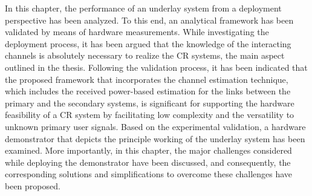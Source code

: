 In this chapter, the performance of an underlay system from a deployment perspective has been analyzed. To this end, an analytical framework has been validated by means of hardware measurements. 
While investigating the deployment process, it has been argued that the knowledge of the interacting channels is absolutely necessary to realize the CR systems, the main aspect outlined in the thesis. 
Following the validation process, it has been indicated that the proposed framework that incorporates the channel estimation technique, which includes the received power-based estimation for the links between the primary and the secondary systems, is significant for supporting the hardware feasibility of a CR system by facilitating low complexity and the versatility to unknown primary user signals. Based on the experimental validation, a hardware demonstrator that depicts the principle working of the underlay system has been examined. More importantly, in this chapter, the major challenges considered while deploying the demonstrator have been discussed, and consequently, the corresponding solutions and simplifications to overcome these challenges have been proposed.  














